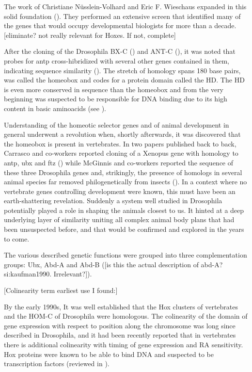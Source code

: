 The work of Christiane Nüsslein-Volhard and Eric F. Wieschaus expanded in this solid foundation (\cite{Nuesslein-Volhard1980}). They performed an extensive screen that identified many of the genes that would occupy developmental biologists for more than a decade. [eliminate? not really relevant for Hoxes. If not, complete]

After the cloning of the Drosophila \ac{BX-C} (\cite{Bender1983}) and \ac{ANT-C} (\cite{Garber1983,Scott1983}), it was noted that probes for \ac{antp} cross-hibridized with several other genes contained in them, indicating sequence similarity (\cite{McGinnis1984}).  The stretch of homology spans 180 base pairs, was called the homeobox and codes for a protein domain called the \ac{HD}. The \ac{HD} is even more conserved in sequence than the homeobox and from the very beginning was suspected to be responsible for DNA binding due to its high content in basic aminoacids (see \cite{Gehring1985}).

Understanding of the homeotic selector genes and of animal development in general underwent a revolution when, shortly afterwards, it was discovered that the homeobox is present in vertebrates. In two papers published back to back, Carrasco and co-workers reported cloning of a Xenopus gene with homology to \ac{antp}, \ac{ubx} and \ac{ftz} (\cite{Carrasco1984}) while McGinnis and co-workers reported the sequence of these three Drosophila genes and, strikingly, the presence of homologs in several animal species far removed philogenetically from insects (\cite{McGinnis1984b}). In a context where no vertebrate genes controlling development were known, this must have been an earth-shattering revelation. Suddenly a system well studied in Drosophila potentially played a role in shaping the animals closest to us. It hinted at a deep underlying layer of similarity uniting all complex animal body plans that had been unsuspected before, and that would be confirmed and explored in the years to come.

The various described genetic functions were grouped into three complementation groups: Ubx, Abd-A and Abd-B (\cite{Sanchez-Herrero1985}[is this the actual description of abd-A?si:kaufman1990. Irrelevant?]).

[Colinearity term earliest use I found:\cite{Lewis1985}]

By the early 1990s, It was well established that the Hox clusters of vertebrates and the \ac{HOM-C} of Drosophila were homologous. The colinearity of the domain of gene expression with respect to position along the chromosome was long since described in  Drosophila, and it had been recently reported that in vertebrates there is additional colinearity with timing of gene expression and RA sensitivity. Hox proteins were known to be able to bind DNA and suspected to be transcription factors (reviewed in \cite{Levine1988, McGinnis1992}). 

